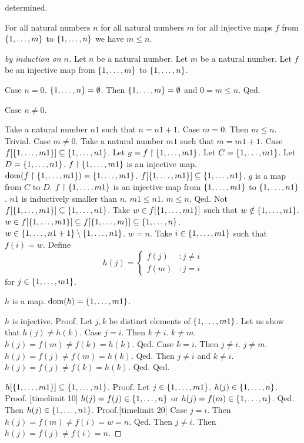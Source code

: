 \documentclass{article}
\begin{document}
determined.
%
\begin{forthel}

\begin{lemma}
For all natural numbers $n$
for all natural numbers $m$
for all injective maps $f$ from 
$\{1,\dots,m\}$ to $\{1,\dots,n\}$ we have $m \leq n$.
\end{lemma}
\begin{proof}[by induction on $n$]
Let $n$ be a natural number.
Let $m$ be a natural number.
Let $f$ be an injective map from $\{1,\dots,m\}$ to $\{1,\dots,n\}$.

Case $n=0$. $\{1,\dots,n\} = \emptyset$. Then $\{1,\dots,m\} = \emptyset$ and 
$0 = m \leq n$. Qed.

Case $n \neq 0$.

Take a natural number $n1$ such that $n = n1 + 1$.
Case $m = 0$. Then $m \leq n$. Trivial.
Case $m \neq 0$.
Take a natural number $m1$ such that $m = m1 + 1$.
Case $f[\{1,\dots,m1\}] \subseteq \{1,\dots,n1\}$.
Let $g = f \upharpoonright \{1,\dots,m1\}$.
Let $C = \{1,\dots,m1\}$. Let $D = \{1,\dots,n1\}$.
$f \upharpoonright \{1,\dots,m1\}$ is an injective map.
$\operatorname{dom}(f \upharpoonright \{1,\dots,m1\}) = \{1,\dots,m1\}$.
$f[\{1,\dots,m1\}] \subseteq \{1,\dots,n1\}$.
$g$ is a map
from $C$ to $D$.
 $f \upharpoonright \{1,\dots,m1\}$ is an injective map
from $\{1,\dots,m1\}$ to $\{1,\dots,n1\}$.
$n1$ is inductively smaller than $n$.
$m1 \leq n1$. $m \leq n$. Qed.
Not $f[\{1,\dots,m1\}] \subseteq \{1,\dots,n1\}$.
Take $w \in f[\{1,\dots,m1\}]$ such that $w \notin \{1,\dots,n1\}$.
$w \in f[\{1,\dots,m1\}] \subseteq f[\{1,\dots,m\}] \subseteq \{1,\dots,n\}$.
$w \in \{1,\dots,n1+1\} \setminus \{1,\dots,n1\}$.
$w = n$.
Take $i \in \{1,\dots,m1\}$ such that $f(i) = w$.
Define
\[h(j) =
  \begin{cases}
  f(j)  & : j \neq i \\
  f(m) & : j = i
  \end{cases} \]
for $j \in \{1,\dots,m1\}$.

$h$ is a map. $\operatorname{dom}(h) = \{1,\dots,m1\}$. 

$h$ is injective.
Proof.
Let $j,k$ be distinct elements of $\{1,\dots,m1\}$.
Let us show that $h(j) \neq h(k)$.
Case $j = i$.
Then $k \neq i$. $k \neq m$.
$h(j) = f(m) \neq f(k) = h(k)$.
Qed.
Case $k = i$.
Then $j \neq i$. $j \neq m$.
$h(j) = f(j) \neq f(m) = h(k)$.
Qed.
Then $j \neq i$ and $k \neq i$.
$h(j) = f(j) \neq f(k) = h(k)$.
Qed.
Qed.





$h[\{1,\dots,m1\}] \subseteq \{1,\dots,n1\}$.
Proof.
Let $j \in \{1,\dots,m1\}$.
$h(j) \in \{1,\dots,n\}$.
Proof.
[timelimit 10]
$h(j) = f(j) \in \{1,\dots,n\}$ or $h(j) = f(m) \in \{1,\dots,n\}$.
Qed.
Then $h(j) \in \{1,\dots,n1\}$.
Proof.[timelimit 20]
  Case $j = i$.
  Then $h(j) = f(m) \neq f(i) = w = n$.
  Qed.
  Then $j \neq i$.
  Then $h(j) = f(j) \neq f(i) = n$.


\end{proof}
\end{forthel}
\end{document}
